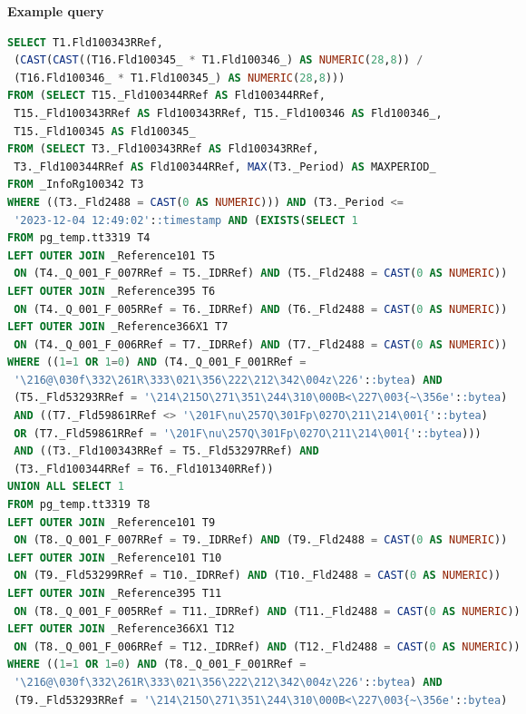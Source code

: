 \documentclass{beamer}
\begin{document}
\begin{frame}[fragile]
\begin{columns}[T]
\begin{column}{0.55\textwidth}
\begin{center}
	{\scriptsize\textbf{Example query}}\par\vspace{2pt}
\end{center}
\begin{tcolorbox}[enhanced, sharp corners=downhill, arc=1pt,
  colback=paper, colframe=mailrule, boxrule=0.4pt,
  left=3pt, right=3pt, top=3pt, bottom=2pt,
  before skip=0pt, after skip=2pt]
\begin{lstlisting}[language=SQL, breaklines=true, columns=fixed,
  basicstyle=\ttfamily\fontsize{3.1}{3.5}\selectfont,
  keywordstyle=\ttfamily]
SELECT T1.Fld100343RRef,
 (CAST(CAST((T16.Fld100345_ * T1.Fld100346_) AS NUMERIC(28,8)) /
 (T16.Fld100346_ * T1.Fld100345_) AS NUMERIC(28,8)))
FROM (SELECT T15._Fld100344RRef AS Fld100344RRef,
 T15._Fld100343RRef AS Fld100343RRef, T15._Fld100346 AS Fld100346_,
 T15._Fld100345 AS Fld100345_
FROM (SELECT T3._Fld100343RRef AS Fld100343RRef,
 T3._Fld100344RRef AS Fld100344RRef, MAX(T3._Period) AS MAXPERIOD_
FROM _InfoRg100342 T3
WHERE ((T3._Fld2488 = CAST(0 AS NUMERIC))) AND (T3._Period <=
 '2023-12-04 12:49:02'::timestamp AND (EXISTS(SELECT 1
FROM pg_temp.tt3319 T4
LEFT OUTER JOIN _Reference101 T5
 ON (T4._Q_001_F_007RRef = T5._IDRRef) AND (T5._Fld2488 = CAST(0 AS NUMERIC))
LEFT OUTER JOIN _Reference395 T6
 ON (T4._Q_001_F_005RRef = T6._IDRRef) AND (T6._Fld2488 = CAST(0 AS NUMERIC))
LEFT OUTER JOIN _Reference366X1 T7
 ON (T4._Q_001_F_006RRef = T7._IDRRef) AND (T7._Fld2488 = CAST(0 AS NUMERIC))
WHERE ((1=1 OR 1=0) AND (T4._Q_001_F_001RRef =
 '\216@\030f\332\261R\333\021\356\222\212\342\004z\226'::bytea) AND
 (T5._Fld53293RRef = '\214\215O\271\351\244\310\000B<\227\003{~\356e'::bytea)
 AND ((T7._Fld59861RRef <> '\201F\nu\257Q\301Fp\027O\211\214\001{'::bytea)
 OR (T7._Fld59861RRef = '\201F\nu\257Q\301Fp\027O\211\214\001{'::bytea)))
 AND ((T3._Fld100343RRef = T5._Fld53297RRef) AND
 (T3._Fld100344RRef = T6._Fld101340RRef))
UNION ALL SELECT 1
FROM pg_temp.tt3319 T8
LEFT OUTER JOIN _Reference101 T9
 ON (T8._Q_001_F_007RRef = T9._IDRRef) AND (T9._Fld2488 = CAST(0 AS NUMERIC))
LEFT OUTER JOIN _Reference101 T10
 ON (T9._Fld53299RRef = T10._IDRRef) AND (T10._Fld2488 = CAST(0 AS NUMERIC))
LEFT OUTER JOIN _Reference395 T11
 ON (T8._Q_001_F_005RRef = T11._IDRRef) AND (T11._Fld2488 = CAST(0 AS NUMERIC))
LEFT OUTER JOIN _Reference366X1 T12
 ON (T8._Q_001_F_006RRef = T12._IDRRef) AND (T12._Fld2488 = CAST(0 AS NUMERIC))
WHERE ((1=1 OR 1=0) AND (T8._Q_001_F_001RRef =
 '\216@\030f\332\261R\333\021\356\222\212\342\004z\226'::bytea) AND
 (T9._Fld53293RRef = '\214\215O\271\351\244\310\000B<\227\003{~\356e'::bytea)
\end{lstlisting}
\end{tcolorbox}
\end{column}


\end{columns}
\end{frame}
\end{document}
